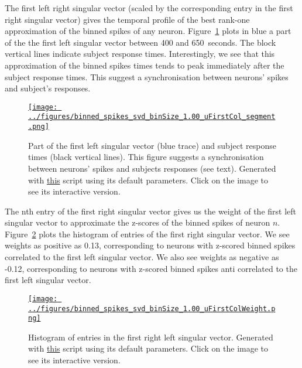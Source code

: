 \documentclass[12pt]{article}
\begin{document}
The first left right singular vector (scaled by the corresponding entry in the
first right singular vector) gives the temporal profile of the best rank-one approximation of the
binned spikes of any neuron.
%
Figure~\ref{fig:firstLeftSingularVector} plots in blue a part of the the first
left singular vector between 400 and 650~seconds. The block vertical lines
indicate subject response times. Interestingly, we see that this approximation
of the binned spikes times tends to peak immediately after the subject response
times. This suggest a synchronisation between neurons' spikes and subject's
responses.

\begin{figure}[H]
    \begin{center}
        \href{https://www.gatsby.ucl.ac.uk/~rapela/neuroinformatics/2023/ws5/figures/binned_spikes_svd_binSize_1.00_uFirstCol.html}{\texttt{[image: ../figures/binned\_spikes\_svd\_binSize\_1.00\_uFirstCol\_segment.png]}}

        \caption{Part of the first left singular vector (blue trace) and subject response times
        (black vertical lines). This figure suggests a synchronisation between
        neurons' spikes and subjects responses (see text).
        Generated with
        \href{https://github.com/joacorapela/neuroinformatics23/blob/master/worksheets/ws5/mySolution/code/scripts/doEx2Plotly.py}{this}
        script using its default parameters. Click on the image to see its
        interactive version.}

        \label{fig:firstLeftSingularVector}
    \end{center}
\end{figure}


The nth entry of the first right singular vector gives us the weight of the
first left singular vector to approximate the z-scores of the binned spikes of
neuron $n$.  Figure~\ref{fig:histEntriesFirstRightSingularVector} plots the
histogram of entries of the first right singular vector. We see
weights as positive as 0.13, corresponding to neurons with z-scored binned
spikes correlated to the first left singular vector. We also see weights
as negative as -0.12, corresponding to neurons with z-scored binned spikes anti
correlated to the first left singular vector.

\begin{figure}[H]
    \begin{center}
        \href{https://www.gatsby.ucl.ac.uk/~rapela/neuroinformatics/2023/ws5/figures/binned_spikes_svd_binSize_1.00_uFirstColWeight.html}{\texttt{[image: ../figures/binned\_spikes\_svd\_binSize\_1.00\_uFirstColWeight.png]}}

        \caption{Histogram of entries in the first right left singular vector.
        Generated with
        \href{https://github.com/joacorapela/neuroinformatics23/blob/master/worksheets/ws5/mySolution/code/scripts/doEx2Plotly.py}{this}
        script using its default parameters. Click on the image to see its
        interactive version.}

        \label{fig:histEntriesFirstRightSingularVector}
    \end{center}
\end{figure}
\end{document}
